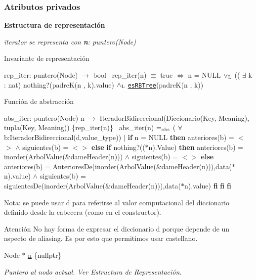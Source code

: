 \subsubsection*{Atributos privados}
\begin{Indent}{\bf Estructura de representación}\par
{\em iterator se representa con {\bfseries n}\+: puntero(\+Node)

\begin{DoxyParagraph}{Invariante de representación}

\end{DoxyParagraph}
rep\+\_\+iter\+: puntero(\+Node) $\to$ bool~\newline
rep\+\_\+iter(n) $\equiv$ true $\Leftrightarrow$ n = N\+U\+LL $\lor_{\rm L}$ (( $\exists$ k \+: nat) nothing?(padre\+K(n , k).value) $\land_{\rm L}$ \href{axiomas.html#esRBTree}{\tt es\+R\+B\+Tree}(padre\+K(n , k))

\begin{DoxyParagraph}{Función de abstracción}

\end{DoxyParagraph}
abs\+\_\+iter\+: puntero(\+Node) n $\to$ Iterador\+Bidireccional(Diccionario(Key, Meaning), tupla(Key, Meaning)) \{rep\+\_\+iter(n)\}~\newline
abs\+\_\+iter(n) $=_{\rm obs}$ ( $\forall$ b\+:Iterador\+Bidireccional(d,value\+\_\+type)) $\vert$ {\bfseries if} n = N\+U\+LL {\bfseries then} anteriores(b) = $<$$>$ $\land$ siguientes(b) = $<$$>$ {\bfseries else} {\bfseries if} nothing?(($\ast$n).Value) {\bfseries then} anteriores(b) = inorder(Arbol\+Value(\&dame\+Header(n))) $\land$ siguientes(b) = $<$$>$ {\bfseries else} anteriores(b) = Anteriores\+De(inorder(Arbol\+Value(\&dame\+Header(n))),data($\ast$n).value) $\land$ siguientes(b) = siguientes\+De(inorder(Arbol\+Value(\&dame\+Header(n))),data($\ast$n).value) {\bfseries fi} {\bfseries fi} {\bfseries fi} 

Nota\+: se puede usar {\ttfamily d} para referirse al valor computacional del diccionario definido desde la cabecera (como en el constructor).

\begin{DoxyAttention}{Atención}
No hay forma de expresar el diccionario {\ttfamily d} porque depende de un aspecto de aliasing. Es por esto que permitimos usar castellano. 
\end{DoxyAttention}
}\begin{DoxyCompactItemize}
\item 
Node $\ast$ \hyperlink{classaed2_1_1map_1_1iterator_adf8633ef71bb6c1fc01c0abe8728fd93_adf8633ef71bb6c1fc01c0abe8728fd93}{n} \{nullptr\}
\begin{DoxyCompactList}\small\item\em Puntero al nodo actual. Ver Estructura de Representación. \end{DoxyCompactList}\end{DoxyCompactItemize}
\end{Indent}


